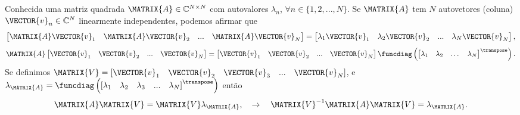 \begin{myproofT}\label{proof:theo:diagonalization1:a}
Conhecida uma matriz quadrada $\MATRIX{A} \in \mathbb{C}^{N \times N}$ com
autovalores $\lambda_n$, $\forall n \in \{1, 2, ..., N\}$.
Se $\MATRIX{A}$ tem $N$  autovetores (coluna) $\VECTOR{v}_n \in \mathbb{C}^{N}$  linearmente independentes,
podemos afirmar que
\begin{equation}
\begin{bmatrix}
\MATRIX{A} \VECTOR{v}_1 & \MATRIX{A} \VECTOR{v}_2 & ... & \MATRIX{A} \VECTOR{v}_N
\end{bmatrix}=
\begin{bmatrix}
\lambda_1 \VECTOR{v}_1 & \lambda_2 \VECTOR{v}_2 & ... & \lambda_N \VECTOR{v}_N
\end{bmatrix},
\end{equation}
\begin{equation}
\MATRIX{A}
\begin{bmatrix}
 \VECTOR{v}_1 &  \VECTOR{v}_2 & ... &  \VECTOR{v}_N
\end{bmatrix}=
\begin{bmatrix}
 \VECTOR{v}_1 & \VECTOR{v}_2 & ... &  \VECTOR{v}_N
\end{bmatrix}
\funcdiag\left(
\begin{bmatrix}
\lambda_1 & \lambda_2 & \dots & \lambda_N
\end{bmatrix}^{\transpose}\right).
\end{equation}
Se definimos $\MATRIX{V}=\left[\VECTOR{v}_1\quad \VECTOR{v}_2\quad \VECTOR{v}_3\quad ...\quad \VECTOR{v}_N\right]$,
e $\lambda_{\MATRIX{A}}=\funcdiag\left(\left[\lambda_1\quad \lambda_2\quad \lambda_3\quad ...\quad \lambda_N\right]^{\transpose}\right)$
então
\begin{equation}
\MATRIX{A} \MATRIX{V} = \MATRIX{V} \lambda_{\MATRIX{A}},
\quad \rightarrow \quad
\MATRIX{V}^{-1} \MATRIX{A} \MATRIX{V} =  \lambda_{\MATRIX{A}}.
\end{equation}
\end{myproofT}
